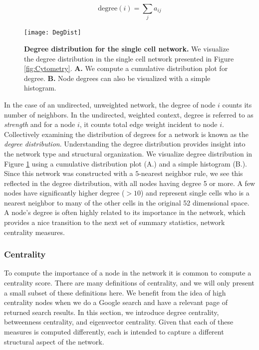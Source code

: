 \begin{equation}
\text{degree}(i)=\sum_{j}a_{ij}
\end{equation}

\begin{figure}
\begin{center}
\texttt{[image: DegDist]}
\caption{{\bf Degree distribution for the single cell network.} We visualize the degree distribution in the single cell network presented in Figure \ref{fig:Cytometry}. {\bf A.} We compute a cumulative distribution plot for degree. {\bf B.} Node degrees can also be visualized with a simple histogram.}
\label{fig:DegDist}
\end{center}
\end{figure}

In the case of an undirected, unweighted network, the degree of node $i$ counts its number of neighbors. In the undirected, weighted context, degree is referred to as \emph{strength} and for a node $i$, it counts total edge weight incident to node $i$. Collectively examining the distribution of degrees for a network is known as the \emph{degree distribution}. Understanding the degree distribution provides insight into the network type and structural organization.  We visualize degree distribution in Figure \ref{fig:DegDist} using a cumulative distribution plot (A.) and a simple histogram (B.). Since this network was constructed with a $5$-nearest neighbor rule, we see this reflected in the degree distribution, with all nodes having degree 5 or more. A few nodes have significantly higher degree ($> 10$) and represent single cells who is a nearest neighbor to many of the other cells in the original 52 dimensional space. A node's degree is often highly related to its importance in the network, which provides a nice transition to the next set of summary statistics, network centrality measures.

\subsubsection{Centrality}
\indent To compute the importance of a node in the network it is common to compute a centrality score. There are many definitions of centrality, and we will only present a small subset of these definitions here. We benefit from the idea of high centrality nodes when we do a Google search and have a relevant page of returned search results. In this section, we introduce degree centrality, betweenness centrality, and eigenvector centrality. Given that each of these measures is computed differently, each is intended to capture a different structural aspect of the network. 

